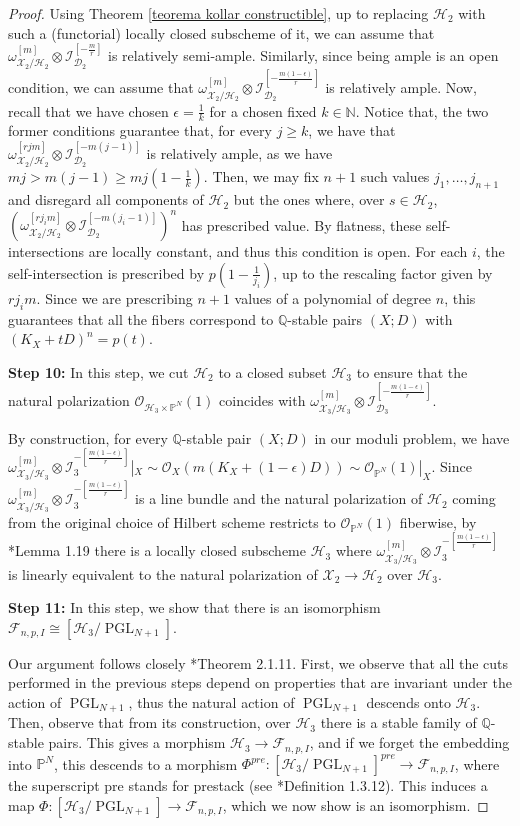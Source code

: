 \documentclass{amsart}
\newcommand{\bP}{\mathbb{P}}
\newcommand{\bQ}{\mathbb{Q}}
\newcommand{\sD}{\mathscr{D}}
\newcommand{\sF}{\mathscr{F}}
\newcommand{\sH}{\mathscr{H}}
\newcommand{\sI}{\mathscr{I}}
\newcommand{\sX}{\mathscr{X}}
\newcommand{\cH}{\mathcal{H}}
\newcommand{\PGL}{\operatorname{PGL}}
\theoremstyle{definition}
\newcommand{\rar}{\rightarrow}
\def\O#1.{\mathcal {O}_{#1}}
\def\K#1.{K_{#1}}
\begin{document}
\begin{proof}
Using Theorem \ref{teorema kollar constructible}, up to replacing $\cH_2$ with such a (functorial) locally closed subscheme of it, we can assume that $\omega_{\sX_2/\sH_2}^{[m]}\otimes \sI_{\sD_2}^{[-\frac{m}{r}]}$ is relatively semi-ample.
Similarly, since being ample is an open condition, we can assume that $\omega_{\sX_2/\sH_2}^{[m]} \otimes \sI_{\sD_2}^{[-\frac{m(1-\epsilon)}{r}]}$ is relatively ample.
Now, recall that we have chosen $\epsilon = \frac{1}{k}$ for a chosen fixed $k \in \mathbb N$.
Notice that, the two former conditions guarantee that, for every $j \geq k$, we have that $\omega_{\sX_2/\sH_2}^{[rjm]} \otimes \sI_{\sD_2}^{[-m(j-1)]}$ is relatively ample, as we have $mj > m(j-1) \geq mj(1-\frac{1}{k})$.
Then, we may fix $n+1$ such values $j_1,\ldots,j_{n+1}$ and disregard all components of $\sH_2$ but the ones where, over $s \in \sH_2$, $(\omega_{\sX_2/\sH_2}^{[rj_im]} \otimes \sI_{\sD_2}^{[-m(j_i-1)]})^n$ has prescribed value.
By flatness, these self-intersections are locally constant, and thus this condition is open.
For each $i$, the self-intersection is prescribed by $p(1-\frac{1}{j_i})$, up to the rescaling factor given by $rj_im$.
Since we are prescribing $n+1$ values of a polynomial of degree $n$, this guarantees that all the fibers correspond to $\bQ$-stable pairs $(X;D)$ with $(K_X+tD)^n=p(t)$.


{\bf Step 10:} In this step, we cut $\sH_2$ to a closed subset $\sH_3$ to ensure that the natural polarization $\O \sH_3 \times \mathbb{P}^N.(1)$ coincides with $\omega_{\sX_3/\sH_3}^{[m]} \otimes \sI_{\sD_3}^{[-\frac{m(1-\epsilon)}{r}]}$.


By construction, for every $\bQ$-stable pair $(X;D)$ in our moduli problem, we have $\omega_{\sX_3/\sH_3}^{[m]} \otimes \sI_3^{-[\frac{m(1-\epsilon)}{r}]}|_X \sim \O X. (m(\K X. + (1-\epsilon)D)) \sim \O \mathbb P ^N .(1)|_X$.
Since $\omega_{\sX_3/\sH_3}^{[m]} \otimes \sI_3^{-[\frac{m(1-\epsilon)}{r}]}$ is a line bundle and the natural polarization of $\sH_2$ coming from the original choice of Hilbert scheme restricts to $\O \mathbb P ^ N. (1)$ fiberwise, by \cite{Vie95}*{Lemma 1.19} there is a locally closed subscheme $\sH_3$ where $\omega_{\sX_3/\sH_3}^{[m]} \otimes \sI_3^{-[\frac{m(1-\epsilon)}{r}]}$ is linearly equivalent to the natural polarization of $\sX_2 \rar \sH_2$ over $\sH_3$.

{\bf Step 11:} In this step, we show that there is an isomorphism $\sF_{n,p,I}\cong [\sH_3/\PGL_{N+1}] $.

Our argument follows closely \cite{Alp21}*{Theorem 2.1.11}.
First, we observe that all the cuts performed in the previous steps depend on properties that are invariant under the action of $\PGL_{N+1}$, thus the natural action of $\PGL_{N+1}$ descends onto $\sH_3$.
Then, observe that from its construction, over $\sH_3$ there is a stable family of $\bQ$-stable pairs.
This gives a morphism $\sH_3 \to \sF_{n,p,I}$, and if we forget the embedding into $\bP^N$, this descends to a morphism $\Phi^{pre} \colon [\sH_3/\PGL_{N+1}]^{pre} \to \sF_{n,p,I}$, where the superscript pre stands for prestack (see \cite{Alp21}*{Definition 1.3.12}).
This induces a map $\Phi \colon [\sH_3/\PGL_{N+1}] \to \sF_{n,p,I}$, which we now show is an isomorphism.


\end{proof}
\end{document}
